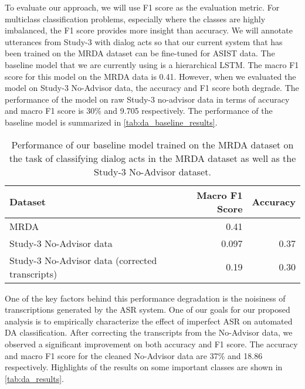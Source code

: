 To evaluate our approach, we will use F1 score as the evaluation metric. For
multiclass classification problems, especially where the classes are highly
imbalanced, the F1 score provides more insight than accuracy. We will annotate
utterances from Study-3 with dialog acts so that our current system that has
been trained on the MRDA dataset can be fine-tuned for ASIST data. The baseline
model that we are currently using is a hierarchical LSTM. The macro F1 score
for this model on the MRDA data is 0.41. However, when we evaluated the model
on Study-3 No-Advisor data, the accuracy and F1 score both degrade. The performance
of the model on raw Study-3 no-advisor data in terms of accuracy and
macro F1 score is 30\% and 9.705 respectively. The performance of the baseline
model is summarized in \autoref{tab:da_baseline_results}.

\begin{table}
    \begin{tabular}{lrr}
        \toprule
        Dataset                                         & Macro F1 Score & Accuracy \\\midrule
        MRDA                                            & 0.41           & \\
        Study-3 No-Advisor data                         & 0.097          & 0.37 \\
        Study-3 No-Advisor data (corrected transcripts) & 0.19           & 0.30 \\
        \bottomrule
    \end{tabular}
    \caption{%
        Performance of our baseline model trained on the MRDA dataset on the
        task of classifying dialog acts in the MRDA dataset as well as the
        Study-3 No-Advisor dataset.
    }
    \label{tab:da_baseline_results}
\end{table}

One of the key factors behind this performance degradation is the noisiness of
transcriptions generated by the ASR system. One of our goals for our proposed
analysis is to empirically characterize the effect of imperfect ASR on
automated DA classification.  After correcting the transcripts from the
No-Advisor data, we observed a significant improvement on both accuracy and F1
score. The accuracy and macro F1 score for the cleaned No-Advisor data are 37\%
and 18.86 respectively. Highlights of the results on some important classes are
shown in \autoref{tab:da_results}.

